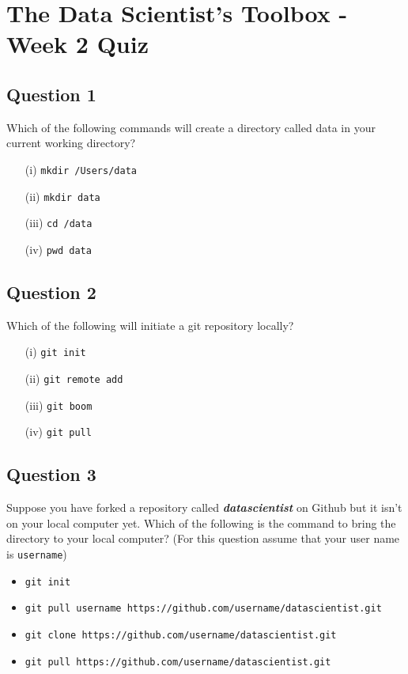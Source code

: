 \documentclass[12pt]{article}
\begin{document}
	
\section*{The Data Scientist’s Toolbox - Week 2 Quiz}
	
	
	
\subsection*{Question 1}
Which of the following commands will create a directory called data in your current working directory?
\begin{itemize}
\item[(i)] \texttt{mkdir /Users/data}
\item[(ii)] \texttt{mkdir data}
\item[(iii)] \texttt{cd /data}
\item[(iv)] \texttt{pwd data}
\end{itemize}
\subsection*{Question 2}
Which of the following will initiate a git repository locally?
\begin{itemize}
\item[(i)] \texttt{git init}
\item[(ii)] \texttt{git remote add}
\item[(iii)] \texttt{git boom}
\item[(iv)] \texttt{git pull}
\end{itemize}
\newpage
\subsection*{Question 3}
Suppose you have forked a repository called \textbf{\textit{datascientist}} on Github but it isn't on your local computer yet. Which of the following is the command to bring the directory to your local computer? (For this question assume that your user name is \texttt{username})

\begin{itemize}
\item \texttt{git init}
\item \texttt{git pull username https://github.com/username/datascientist.git}
\item \texttt{git clone https://github.com/username/datascientist.git}
\item \texttt{git pull https://github.com/username/datascientist.git}
\end{itemize}
\newpage
\end{document}
